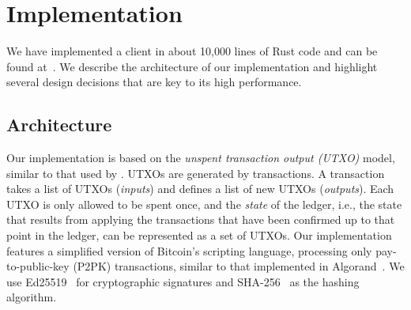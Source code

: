 \section{Implementation}
\label{sec:implementation}

We have implemented a \prism client in about 10,000 lines of Rust code and can be found at~\cite{prismcode}. We describe the architecture of our implementation and highlight several design decisions that are key to its high performance.

\label{sec:implementation-architecture}

\subsection{Architecture}


Our implementation is based on the \textit{unspent transaction output (UTXO)} model, similar to that used by \bitcoin. UTXOs are generated by transactions. A transaction takes a list of UTXOs (\textit{inputs}) and defines a list of new UTXOs (\textit{outputs}). Each UTXO is only allowed to be spent once, and the {\em state} of the ledger, i.e., the state that results from applying the transactions that have been confirmed up to that point in the ledger, can be represented as a set of UTXOs. Our implementation features a simplified version of Bitcoin's scripting language, processing only pay-to-public-key (P2PK) transactions, similar to that implemented in Algorand~\cite{algorand, algorandcode}. We use Ed25519~\cite{ed25519} for cryptographic signatures and SHA-256~\cite{sha256} as the hashing algorithm.

